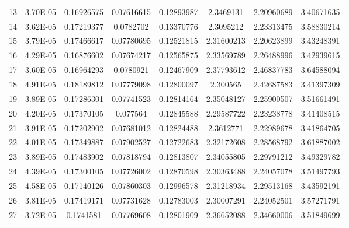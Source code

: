 \documentclass[11pt]{scrartcl}
\theoremstyle{dotlessP}
\theoremstyle{dotlessN}
\theoremstyle{dotN}
\begin{document}
\begin{table}[H]
{\begin{tabular}{c|c|c|c|c|c|c|c}
13    & 3.70E-05  & 0.16926575      & 0.07616615    & 0.12893987          & 2.3469131          & 2.20960689       & 3.40671635             \\
14    & 3.62E-05  & 0.17219377      & 0.0782702     & 0.13370776          & 2.3095212          & 2.23313475       & 3.58830214             \\
15    & 3.79E-05  & 0.17466617      & 0.07780695    & 0.12521815          & 2.31600213         & 2.20623899       & 3.43248391             \\
16    & 4.29E-05  & 0.16876602      & 0.07674217    & 0.12565875          & 2.33569789         & 2.26488996       & 3.42939615             \\
17    & 3.60E-05  & 0.16964293      & 0.0780921     & 0.12467909          & 2.37793612         & 2.46837783       & 3.64588094             \\
18    & 4.91E-05  & 0.18189812      & 0.07779098    & 0.12800097          & 2.300565           & 2.42687583       & 3.41397309             \\
19    & 3.89E-05  & 0.17286301      & 0.07741523    & 0.12814164          & 2.35048127         & 2.25900507       & 3.51661491             \\
20    & 4.20E-05  & 0.17370105      & 0.077564      & 0.12845588          & 2.29587722         & 2.23238778       & 3.41408515             \\
21    & 3.91E-05  & 0.17202902      & 0.07681012    & 0.12824488          & 2.3612771          & 2.22989678       & 3.41864705             \\
22    & 4.01E-05  & 0.17349887      & 0.07902527    & 0.12722683          & 2.32172608         & 2.28568792       & 3.61887002             \\
23    & 3.89E-05  & 0.17483902      & 0.07818794    & 0.12813807          & 2.34055805         & 2.29791212       & 3.49329782             \\
24    & 4.39E-05  & 0.17300105      & 0.07726002    & 0.12870598          & 2.30363488         & 2.24057078       & 3.51497793             \\
25    & 4.58E-05  & 0.17140126      & 0.07860303    & 0.12996578          & 2.31218934         & 2.29513168       & 3.43592191             \\
26    & 3.81E-05  & 0.17419171      & 0.07731628    & 0.12783003          & 2.30007291         & 2.24052501       & 3.57271791             \\
27    & 3.72E-05  & 0.1741581       & 0.07769608    & 0.12801909          & 2.36652088         & 2.34660006       & 3.51849699             \\

\end{tabular}}
\end{table}
\end{document}
